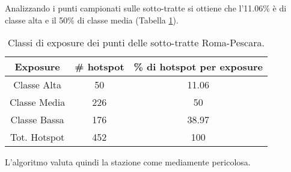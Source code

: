 Analizzando i punti campionati sulle sotto-tratte si ottiene che l'11.06\% è di classe alta e il 50\% di classe media (Tabella \ref{risultati_roma_pescara}). 

\begin{table}[H]
	\centering
	\begin{tabular}{|c|c|c|}
		\hline
		\rowcolor[HTML]{C0C0C0} 
		\textbf{Exposure} & \textbf{\# hotspot} & \textbf{\% di hotspot per exposure} \\ \hline
		Classe Alta       & 50                  & 11.06                                   \\ \hline
		Classe Media      & 226                  & 50                              \\ \hline
		Classe Bassa      & 176                & 38.97                               \\ \hline
		Tot. Hotspot      & 452                & 100                                 \\ \hline
	\end{tabular}
	\caption{Classi di exposure dei punti delle sotto-tratte Roma-Pescara.}
	\label{risultati_roma_pescara}
\end{table}

L'algoritmo valuta quindi la stazione come mediamente pericolosa.


